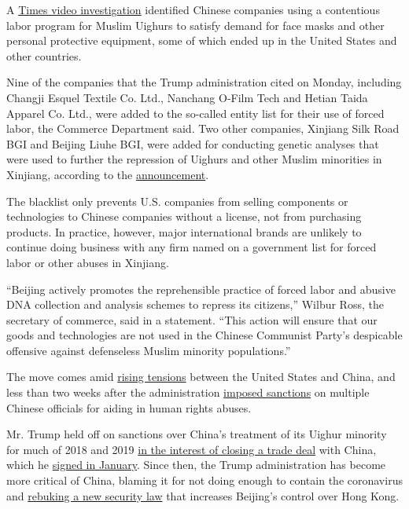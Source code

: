 A
\href{https://www.nytimes3xbfgragh.onion/2020/07/19/world/asia/china-mask-forced-labor.html}{Times
video investigation} identified Chinese companies using a contentious
labor program for Muslim Uighurs to satisfy demand for face masks and
other personal protective equipment, some of which ended up in the
United States and other countries.

Nine of the companies that the Trump administration cited on Monday,
including Changji Esquel Textile Co. Ltd., Nanchang O-Film Tech and
Hetian Taida Apparel Co. Ltd., were added to the so-called entity list
for their use of forced labor, the Commerce Department said. Two other
companies, Xinjiang Silk Road BGI and Beijing Liuhe BGI, were added for
conducting genetic analyses that were used to further the repression of
Uighurs and other Muslim minorities in Xinjiang, according to the
\href{https://www.commerce.gov/news/press-releases/2020/07/commerce-department-adds-eleven-chinese-entities-implicated-human}{announcement}.

The blacklist only prevents U.S. companies from selling components or
technologies to Chinese companies without a license, not from purchasing
products. In practice, however, major international brands are unlikely
to continue doing business with any firm named on a government list for
forced labor or other abuses in Xinjiang.

``Beijing actively promotes the reprehensible practice of forced labor
and abusive DNA collection and analysis schemes to repress its
citizens,'' Wilbur Ross, the secretary of commerce, said in a statement.
``This action will ensure that our goods and technologies are not used
in the Chinese Communist Party's despicable offensive against
defenseless Muslim minority populations.''

The move comes amid
\href{https://www.nytimes3xbfgragh.onion/2020/07/14/world/asia/cold-war-china-us.html}{rising
tensions} between the United States and China, and less than two weeks
after the administration
\href{https://www.nytimes3xbfgragh.onion/2020/07/09/world/asia/trump-china-sanctions-uighurs.html}{imposed
sanctions} on multiple Chinese officials for aiding in human rights
abuses.

Mr. Trump held off on sanctions over China's treatment of its Uighur
minority for much of 2018 and 2019
\href{https://www.nytimes3xbfgragh.onion/2019/05/04/world/asia/trump-china-uighurs-trade-deal.html}{in
the interest of closing a trade deal} with China, which he
\href{https://www.nytimes3xbfgragh.onion/2020/01/15/business/economy/china-trade-deal.html}{signed
in January}. Since then, the Trump administration has become more
critical of China, blaming it for not doing enough to contain the
coronavirus and
\href{https://www.nytimes3xbfgragh.onion/2020/05/29/us/politics/trump-hong-kong-china-WHO.html}{rebuking
a new security law} that increases Beijing's control over Hong Kong.

